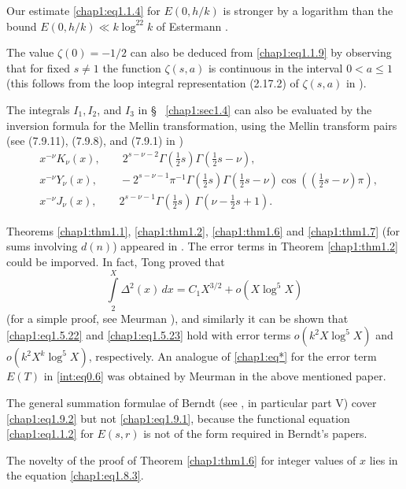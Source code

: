 Our estimate \eqref{chap1:eq1.1.4} for $E(0,h/k)$ is stronger by a
logarithm than the bound $E(0,h/k)\ll k\log^22k$ of Estermann
\cite{key8}. 

The value $\zeta(0)=-1/2$ can also be deduced from
\eqref{chap1:eq1.1.9} by observing that for fixed $s\neq 1$ the
function $\zeta(s,a)$ is continuous in the interval $0<a\leq 1$ (this
follows \eg from the loop integral representation
(2.17.2) of $\zeta(s,a)$ in \cite{key27}).

The integrals $I_1, I_2$, and $I_3$ in \S~ \ref{chap1:sec1.4} can also
be evaluated by the inversion formula for the Mellin transformation,
using the Mellin transform pairs (see (7.9.11), (7.9.8), and (7.9.1)
in \cite{key26})
\begin{align*}
& x^{-\nu}K_\nu(x), \qquad 2^{s-\nu-2}\Gamma\left(\frac{1}{2}s\right)
\Gamma\left(\frac{1}{2}s-\nu\right),\\
& x^{-\nu}Y_\nu(x), \qquad -2^{s-\nu-1}\pi^{-1}\Gamma\left(\frac{1}{2}s
\right)\Gamma\left(\frac{1}{2}s-\nu\right)\cos\left(\left(\frac{1}{2}
s-\nu\right)\pi\right),\\
& x^{-\nu}J_\nu(x), \qquad 2^{s-\nu-1}\Gamma\left(\frac{1}{2}s\right)
\ \Gamma \left(\nu-\frac{1}{2}s+1\right).
\end{align*}\pageoriginale

Theorems \ref{chap1:thm1.1}, \ref{chap1:thm1.2}, \ref{chap1:thm1.6} 
and \ref{chap1:thm1.7} (for sums involving $d(n)$)
appeared in \cite{key18}. The error terms in Theorem
\ref{chap1:thm1.2} could be imporved. In fact, Tong \cite{key28}
proved that 
\begin{equation*}\label{chap1:eq*}
\int\limits_2^X\Delta^2(x)\,dx=C_1X^{3/2}+o(X\log^5X)\tag{*}
\end{equation*}
(for a simple proof, see Meurman \cite{key22}), and similarly it can
be shown that \eqref{chap1:eq1.5.22} and \eqref{chap1:eq1.5.23} hold with
error terms $o(k^2X\log^5X)$ and \break $o(k^2X^k\log^5X)$,
respectively. An analogue of \eqref{chap1:eq*} for the error term
$E(T)$ in \eqref{int:eq0.6} was obtained by Meurman in the above
mentioned paper. 

The general summation formulae of Berndt (see \cite{key3}, in
particular part V) cover \eqref{chap1:eq1.9.2} but not
\eqref{chap1:eq1.9.1}, because the functional equation
\eqref{chap1:eq1.1.2} for $E(s,r)$ is not of the form required in
Berndt's papers. 

The novelty of the proof of Theorem \ref{chap1:thm1.6} for integer
values of $x$ lies in the equation \eqref{chap1:eq1.8.3}. 


